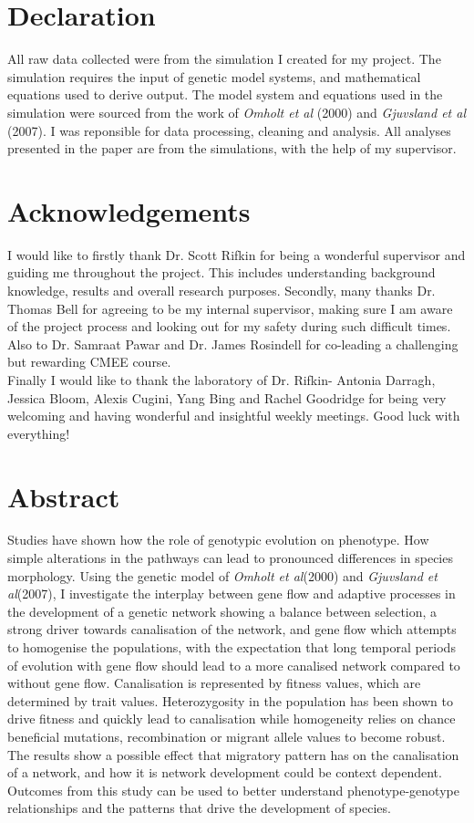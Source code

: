 \documentclass[11pt]{article}
\begin{document}


\newpage

\section{Declaration}
All raw data collected were from the simulation I created for my project. The simulation requires the input of genetic model systems, and mathematical equations used to derive output. The model system and equations used in the simulation were sourced from the work of \textit{Omholt et al} (2000) and \textit{Gjuvsland et al} (2007). I was reponsible for data processing, cleaning and analysis. All analyses presented in the paper are from the simulations, with the help of my supervisor.

\section{Acknowledgements}
I would like to firstly thank Dr. Scott Rifkin for being a wonderful supervisor and guiding me throughout the project. This includes understanding background knowledge, results and overall research purposes. Secondly, many thanks Dr. Thomas Bell for agreeing to be my internal supervisor, making sure I am aware of the project process and looking out for my safety during such difficult times. Also to Dr. Samraat Pawar and Dr. James Rosindell for co-leading a challenging but rewarding CMEE course.
\\Finally I would like to thank the laboratory of Dr. Rifkin- Antonia Darragh, Jessica Bloom, Alexis Cugini, Yang Bing and Rachel Goodridge for being very welcoming and having wonderful and insightful weekly meetings. Good luck with everything!

\newpage

\section{Abstract}
Studies have shown how the role of genotypic evolution on phenotype. How simple alterations in the pathways can lead to pronounced differences in species morphology. Using the genetic model of \textit{Omholt et al}(2000) and \textit{Gjuvsland et al}(2007), I investigate the interplay between gene flow and adaptive processes in the development of a genetic network showing a balance between selection, a strong driver towards canalisation of the network, and gene flow which attempts to homogenise the populations, with the expectation that long temporal periods of evolution with gene flow should lead to a more canalised network compared to without gene flow. Canalisation is represented by fitness values, which are determined by trait values. Heterozygosity in the population has been shown to drive fitness and quickly lead to canalisation while homogeneity relies on chance beneficial mutations, recombination or migrant allele values to become robust. The results show a possible effect that migratory pattern has on the canalisation of a network, and how it is network development could be context dependent. Outcomes from this study can be used to better understand phenotype-genotype relationships and the patterns that drive the development of species.
\end{document}
